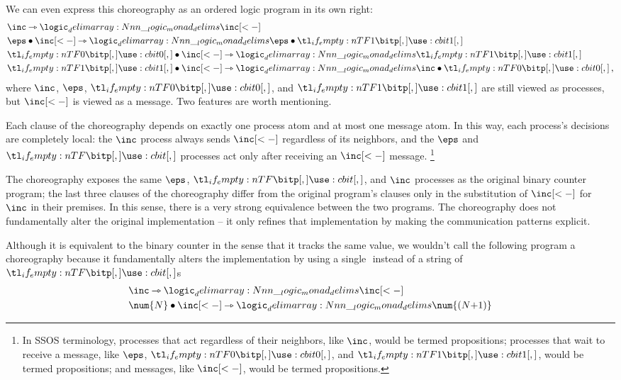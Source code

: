 We can even express this choreography as an ordered logic program in its own right:
\begin{align*}
  &\inc \lrimp \monad{\inc[<-]} \\
  &\eps \fuse \inc[<-] \lrimp \monad{\eps \fuse \bit{1}} \\
  &\bit{0} \fuse \inc[<-] \lrimp \monad{\bit{1}} \\
  &\bit{1} \fuse \inc[<-] \lrimp \monad{\inc \fuse \bit{0}} \text{\,,}
\end{align*}
where $\inc$, $\eps$, $\bit{0}$, and $\bit{1}$ are still viewed as processes, but $\inc[<-]$ is viewed as a message.
%
Two features are worth mentioning.
\begin{description}[font=\normalfont\itshape, leftmargin=\parindent, labelindent=\leftmargin]
\item[Local decisions.]
Each clause of the choreography depends on exactly one process atom and at most one message atom.
In this way, each process's decisions are completely local: the $\inc$ process always sends $\inc[<-]$ regardless of its neighbors, and the $\eps$ and $\bit{}$ processes act only after receiving an $\inc[<-]$ message.%
\footnote{In \ac{SSOS} terminology, processes that act regardless of their neighbors, like $\inc$, would be termed  propositions; processes that wait to receive a message, like $\eps$, $\bit{0}$, and $\bit{1}$, would be termed  propositions; and messages, like $\inc[<-]$, would be termed  propositions.}
%
\item[Preserves implementation.]
The choreography exposes the same $\eps$, $\bit{}$, and $\inc$ processes as the original binary counter program; the last three clauses of the choreography differ from the original program's clauses only in the substitution of $\inc[<-]$ for $\inc$ in their premises.
In this sense, there is a very strong equivalence between the two programs.
The choreography does not fundamentally alter the original implementation -- it only refines that implementation by making the communication patterns explicit.

%
Although it is equivalent to the binary counter in the sense that it tracks the same value, we wouldn't call the following program a choreography because it fundamentally alters the implementation by using a single $\num{}$ instead of a string of $\bit{}$s
\begin{align*}
  &\inc \lrimp \monad{\inc[<-]} \\
  &\num{N} \fuse \inc[<-] \lrimp \monad{\num{(N{+}1)}}
\end{align*}
\end{description}

